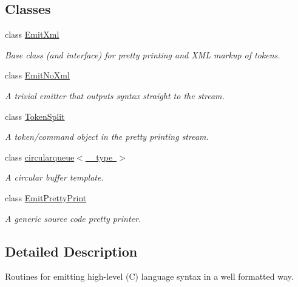 \subsection*{Classes}
\begin{DoxyCompactItemize}
\item 
class \mbox{\hyperlink{class_emit_xml}{Emit\+Xml}}
\begin{DoxyCompactList}\small\item\em Base class (and interface) for pretty printing and X\+ML markup of tokens. \end{DoxyCompactList}\item 
class \mbox{\hyperlink{class_emit_no_xml}{Emit\+No\+Xml}}
\begin{DoxyCompactList}\small\item\em A trivial emitter that outputs syntax straight to the stream. \end{DoxyCompactList}\item 
class \mbox{\hyperlink{class_token_split}{Token\+Split}}
\begin{DoxyCompactList}\small\item\em A token/command object in the pretty printing stream. \end{DoxyCompactList}\item 
class \mbox{\hyperlink{classcircularqueue}{circularqueue$<$ \+\_\+type $>$}}
\begin{DoxyCompactList}\small\item\em A circular buffer template. \end{DoxyCompactList}\item 
class \mbox{\hyperlink{class_emit_pretty_print}{Emit\+Pretty\+Print}}
\begin{DoxyCompactList}\small\item\em A generic source code pretty printer. \end{DoxyCompactList}\end{DoxyCompactItemize}


\subsection{Detailed Description}
Routines for emitting high-\/level (C) language syntax in a well formatted way. 

